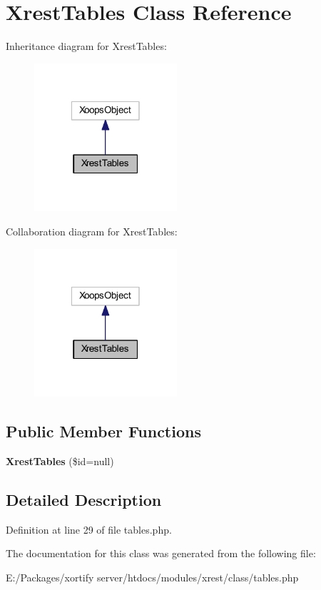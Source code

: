 \hypertarget{class_xrest_tables}{\section{Xrest\-Tables Class Reference}
\label{class_xrest_tables}
}


Inheritance diagram for Xrest\-Tables\-:
\nopagebreak
\begin{figure}[H]
\begin{center}
\leavevmode
\includegraphics[width=150pt]{class_xrest_tables__inherit__graph}
\end{center}
\end{figure}


Collaboration diagram for Xrest\-Tables\-:
\nopagebreak
\begin{figure}[H]
\begin{center}
\leavevmode
\includegraphics[width=150pt]{class_xrest_tables__coll__graph}
\end{center}
\end{figure}
\subsection*{Public Member Functions}
\begin{DoxyCompactItemize}
\item 
\hypertarget{class_xrest_tables_a2716403b08acf7188c81955ec1f3d085}{{\bfseries Xrest\-Tables} (\$id=null)}\label{class_xrest_tables_a2716403b08acf7188c81955ec1f3d085}

\end{DoxyCompactItemize}


\subsection{Detailed Description}


Definition at line 29 of file tables.\-php.



The documentation for this class was generated from the following file\-:\begin{DoxyCompactItemize}
\item 
E\-:/\-Packages/xortify server/htdocs/modules/xrest/class/tables.\-php\end{DoxyCompactItemize}

